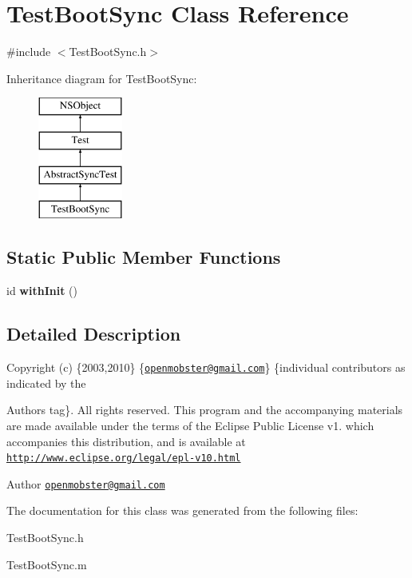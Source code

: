 \hypertarget{interface_test_boot_sync}{
\section{\-Test\-Boot\-Sync \-Class \-Reference}
\label{interface_test_boot_sync}
}


{\ttfamily \#include $<$\-Test\-Boot\-Sync.\-h$>$}

\-Inheritance diagram for \-Test\-Boot\-Sync\-:\begin{figure}[H]
\begin{center}
\leavevmode
\includegraphics[height=4.000000cm]{interface_test_boot_sync}
\end{center}
\end{figure}
\subsection*{\-Static \-Public \-Member \-Functions}
\begin{DoxyCompactItemize}
\item 
\hypertarget{interface_test_boot_sync_a3db9d9d191768fb60a62c74a48569904}{
id {\bfseries with\-Init} ()}
\label{interface_test_boot_sync_a3db9d9d191768fb60a62c74a48569904}

\end{DoxyCompactItemize}


\subsection{\-Detailed \-Description}
\-Copyright (c) \{2003,2010\} \{\href{mailto:openmobster@gmail.com}{\tt openmobster@gmail.\-com}\} \{individual contributors as indicated by the \begin{DoxyAuthor}{\-Authors}
tag\}. \-All rights reserved. \-This program and the accompanying materials are made available under the terms of the \-Eclipse \-Public \-License v1. which accompanies this distribution, and is available at \href{http://www.eclipse.org/legal/epl-v10.html}{\tt http\-://www.\-eclipse.\-org/legal/epl-\/v10.\-html}
\end{DoxyAuthor}
\begin{DoxyAuthor}{\-Author}
\href{mailto:openmobster@gmail.com}{\tt openmobster@gmail.\-com} 
\end{DoxyAuthor}


\-The documentation for this class was generated from the following files\-:\begin{DoxyCompactItemize}
\item 
\-Test\-Boot\-Sync.\-h\item 
\-Test\-Boot\-Sync.\-m\end{DoxyCompactItemize}
